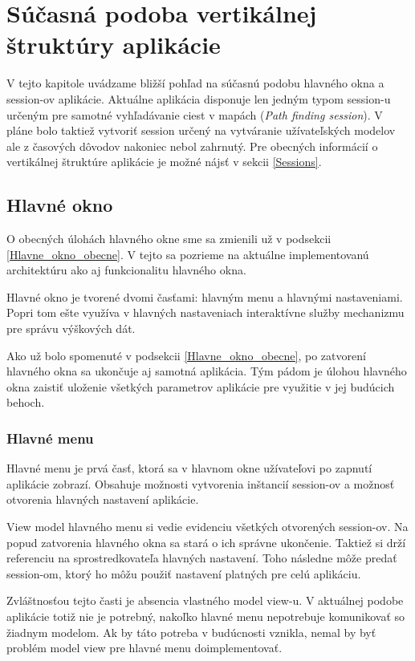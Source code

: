 \chapter{Súčasná podoba vertikálnej štruktúry aplikácie}

V tejto kapitole uvádzame bližší pohľad na súčasnú podobu hlavného okna a session-ov aplikácie. Aktuálne aplikácia disponuje len jedným typom session-u určeným pre samotné vyhľadávanie ciest v mapách (\textit{Path finding session}). V pláne bolo taktiež vytvoriť session určený na vytváranie užívateľských modelov ale z časových dôvodov nakoniec nebol zahrnutý. Pre obecných informácií o vertikálnej štruktúre aplikácie je možné nájsť v sekcii \ref{Sessions}.

\section{Hlavné okno}

O obecných úlohách hlavného okne sme sa zmienili už v podsekcii \ref{Hlavne_okno_obecne}. V tejto sa pozrieme na aktuálne implementovanú architektúru ako aj funkcionalitu hlavného okna.


Hlavné okno je tvorené dvomi časťami: hlavným menu a hlavnými nastaveniami.
Popri tom ešte využíva v hlavných nastaveniach interaktívne služby mechanizmu pre správu výškových dát.

Ako už bolo spomenuté v podsekcii \ref{Hlavne_okno_obecne}, po zatvorení hlavného okna sa ukončuje aj samotná aplikácia. Tým pádom je úlohou hlavného okna zaistiť uloženie všetkých parametrov aplikácie pre využitie v jej budúcich behoch.

\subsection{Hlavné menu}

Hlavné menu je prvá časť, ktorá sa v hlavnom okne užívateľovi po zapnutí aplikácie zobrazí. Obsahuje možnosti vytvorenia inštancií session-ov a možnosť otvorenia hlavných nastavení aplikácie. 

View model hlavného menu si vedie evidenciu všetkých otvorených session-ov. Na popud zatvorenia hlavného okna sa stará o ich správne ukončenie. Taktiež si drží referenciu na sprostredkovateľa hlavných nastavení. Toho následne môže predať session-om, ktorý ho môžu použiť nastavení platných pre celú aplikáciu.

Zvláštnosťou tejto časti je absencia vlastného model view-u. V aktuálnej podobe aplikácie totiž nie je potrebný, nakoľko hlavné menu nepotrebuje komunikovať so žiadnym modelom. Ak by táto potreba v budúcnosti vznikla, nemal by byť problém model view pre hlavné menu doimplementovať. 

